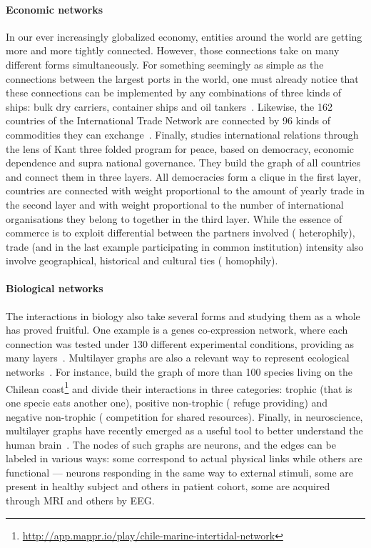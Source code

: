 \paragraph{Economic networks} In our ever increasingly globalized economy, entities around the world
are getting more and more tightly connected. However, those connections take on many different
forms simultaneously. For something seemingly as simple as the connections
between the largest  ports in the world, one must already notice that these connections can be
implemented by any combinations of three kinds of ships: bulk dry carriers, container ships and oil
tankers~\autocite{ports3kindofships10}. Likewise, the 162 countries of the International Trade
Network are connected by 96 kinds of commodities they can exchange~\autocite{worldTradeNetwork10}.
Finally, \textcite{KantPeace15} studies international relations through the lens of Kant three
folded program for peace,  based on democracy, economic dependence and supra national governance.
They build the graph of all countries and connect them in three layers. All democracies form a
clique in the first layer, countries are connected with weight proportional to the amount of yearly
trade in the second layer and with weight proportional to the number of international organisations
they belong to together in the third layer. While the essence of commerce is to exploit differential
between the partners involved (\ie{} heterophily), trade (and in the last example participating in
common institution) intensity also involve geographical, historical and cultural ties (\ie{}
homophily).

\paragraph{Biological networks} The interactions in biology also take several forms and studying
them as a whole has proved fruitful. One example is a genes co-expression network, where each
connection was tested under 130 different experimental conditions, providing as many
layers~\autocite{bioLayerExp11}.
Multilayer graphs are also a relevant way to represent ecological
networks~\autocite{EcologyMultiReview17}. For instance, \textcite{EcoChile15} build the graph of
more than 100 species living on the Chilean
coast\footnote{\url{http://app.mappr.io/play/chile-marine-intertidal-network}} and divide their
interactions in three categories: trophic (that is one specie eats another one), positive
non-trophic (\eg{} refuge providing) and negative non-trophic (\eg{} competition for shared
resources).
Finally, in neuroscience, multilayer graphs have recently emerged as a useful tool to better
understand the human brain~\autocite{Neuroscience16}. The nodes of such graphs are neurons, and the
edges can be labeled in various ways: some correspond to actual physical links while others are
functional ---\ie{} neurons responding in the same way to external stimuli, some are present in
healthy subject and others in patient cohort, some are acquired through MRI and others by EEG.
